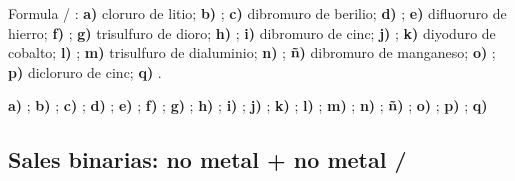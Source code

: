 \begin{exercise}
    Formula / : \textbf{a)} cloruro de litio; \textbf{b)} ; \textbf{c)} dibromuro de berilio; \textbf{d)} ; \textbf{e)} difluoruro de hierro; \textbf{f)} ; \textbf{g)} trisulfuro de dioro; \textbf{h)} ; \textbf{i)} dibromuro de cinc; \textbf{j)} ; \textbf{k)} diyoduro de cobalto; \textbf{l)} ; \textbf{m)} trisulfuro de dialuminio; \textbf{n)} ; \textbf{ñ)} dibromuro de manganeso; \textbf{o)} ; \textbf{p)} dicloruro de cinc; \textbf{q)} .
    \begin{solu}
        \textbf{a)} \textcolor{red}{}; \textbf{b)} \textcolor{red}{}; \textbf{c)} \textcolor{red}{}; \textbf{d)} \textcolor{red}{}; \textbf{e)} \textcolor{red}{}; \textbf{f)} \textcolor{red}{}; \textbf{g)} \textcolor{red}{}; \textbf{h)} \textcolor{red}{}; \textbf{i)} \textcolor{red}{}; \textbf{j)} \textcolor{red}{}; \textbf{k)} \textcolor{red}{}; \textbf{l)} \textcolor{red}{}; \textbf{m)} \textcolor{red}{}; \textbf{n)} \textcolor{red}{}; \textbf{ñ)} \textcolor{red}{}; \textbf{o)} \textcolor{red}{}; \textbf{p)} \textcolor{red}{}; \textbf{q)} \textcolor{red}{}
    \end{solu}
\end{exercise}

\subsection{Sales binarias: no metal + no metal / }

